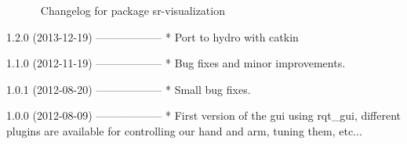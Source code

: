 ^^^^^^^^^^^^^^^^^^^^^^^^^^^^^^
Changelog for package sr-visualization
^^^^^^^^^^^^^^^^^^^^^^^^^^^^^^

1.2.0 (2013-12-19)
------------------
* Port to hydro with catkin

1.1.0 (2012-11-19)
------------------
* Bug fixes and minor improvements.

1.0.1 (2012-08-20)
------------------
* Small bug fixes.

1.0.0 (2012-08-09)
------------------
* First version of the gui using rqt\_gui, different plugins are available for controlling our hand and arm, tuning them, etc...

